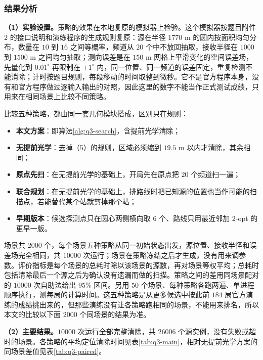 \subsubsection{结果分析}\label{sec:q3-4}

\textbf{（1）实验设置。}策略的效果在本地复原的模拟器上检验。这个模拟器按题目附件 2 的接口说明和演练程序的生成规则复原：源在半径 $1770$ m 的圆内按面积均匀分布，数量在 $10$ 到 $16$ 之间等概率，频道从 $20$ 个中不放回抽取，接收半径在 $1000$ 到 $1500$ m 之间均匀抽取；测向误差是在 $150$ m 网格上平滑变化的空间误差场，先量化到 $0.01^\circ$ 再限制在 $\pm1^\circ$ 内，同一位置、同一频道的误差固定，重复检测不能消除；计时按题目规则，每段移动的时间取整到微秒。它不是官方程序本身，没有和官方程序做过逐输入输出的对照，因此这里的数字不能当作正式测试成绩，只用来在相同场景上比较不同策略。

比较五种策略，都由同一套几何模块搭成，区别只在规则：
\begin{itemize}
\item \textbf{本文方案}：即算法\ref{alg:q3-search}，含提前光学清除；
\item \textbf{无提前光学}：去掉（5）的规则，区域必须缩到 $19.5$ m 以内才清除，其余相同；
\item \textbf{原点先扫}：在无提前光学的基础上，开局先在原点把 $20$ 个频道扫一遍；
\item \textbf{联合规划}：在无提前光学的基础上，排路线时把已知源的位置也当作可能的扫描点，若能替代某个站就剪掉那个站；
\item \textbf{早期版本}：候选探测点只在圆心两侧横向取 $6$ 个、路线只用最近邻加 2-opt 的更早一版。
\end{itemize}
场景共 $2000$ 个，每个场景五种策略从同一初始状态出发，源位置、接收半径和误差场完全相同，共 $10000$ 次运行；场景在策略冻结之后才生成，没有用来调参数。评价指标是每个场景的总耗时除以该场景的源数，再对场景等权平均；总耗时包括清除最后一个源之后为确认没有遗漏而做的扫描。策略之间的差用同场景配对的 $10000$ 次自助法给出 $95\%$ 区间。另用 $50$ 个场景、每种策略各跑两遍、单进程顺序执行，测每局的计算时间。这五种策略是从更多候选中按此前 $184$ 局官方演练的成绩挑出来的，但那些演练没有让各策略跑相同的场景，不能用来排名，所以本文的比较以下面 $2000$ 个同场景的结果为准。

\textbf{（2）主要结果。}$10000$ 次运行全部完整清除，共 $26006$ 个源实例，没有失败或超时的场景。各策略的平均定位清除时间见表\ref{tab:q3-main}，相对无提前光学方案的同场景差值见表\ref{tab:q3-paired}。

